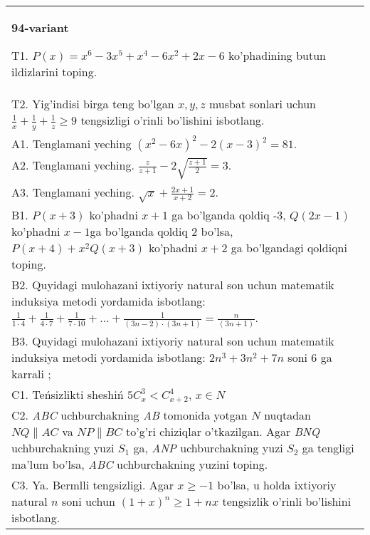 \documentclass{article}
\begin{document}
\begin{tabular}{m{17cm}}
\textbf{94-variant}
\newline

T1. \(P(x) = x^{6} - 3x^{5} + x^{4} - 6x^{2} + 2x - 6\) ko'phadining butun ildizlarini toping. \\
T2. Yig'indisi birga teng bo'lgan \(x,y,z\) musbat sonlari uchun \(\frac{1}{x} + \frac{1}{y} + \frac{1}{z} \geq 9\) tengsizligi o'rinli bo'lishini isbotlang. \\
A1. Tenglamani yeching \(\left( x^{2} - 6x \right)^{2} - 2(x - 3)^{2} = 81\). \\
A2. Tenglamani yeching. \(\frac{z}{z + 1} - 2\sqrt{\frac{z + 1}{2}} = 3\). \\
A3. Tenglamani yeching. \(\sqrt{x} + \frac{2x + 1}{x + 2} = 2\). \\
B1. \(P(x + 3)\) ko'phadni \(x + 1\) ga bo'lganda qoldiq -3, \(Q(2x - 1)\) ko'phadni \(x - 1\)ga bo'lganda qoldiq 2 bo'lsa, \(P(x + 4) + x^{2}Q(x + 3)\) ko'phadni \(x + 2\) ga bo'lgandagi qoldiqni toping. \\
B2. Quyidagi mulohazani ixtiyoriy natural son uchun matematik induksiya metodi yordamida isbotlang: \(\frac{1}{1 \cdot 4} + \frac{1}{4 \cdot 7} + \frac{1}{7 \cdot 10} + \ldots + \frac{1}{(3n - 2) \cdot (3n + 1)} = \frac{n}{(3n + 1)}\). \\
B3. Quyidagi mulohazani ixtiyoriy natural son uchun matematik induksiya metodi yordamida isbotlang: \(2n^{3} + 3n^{2} + 7n\) soni 6 ga karrali ; \\
C1. Teńsizlikti sheshiń \(5C_{x}^{3} < C_{x + 2}^{4}\), \(x \in N\) \\
C2. \emph{ABC} uchburchakning \emph{AB} tomonida yotgan \(N\) nuqtadan \(NQ\| AC\) va \(NP\| BC\) to'g'ri chiziqlar o'tkazilgan. Agar \emph{BNQ} uchburchakning yuzi \(S_{1}\) ga, \emph{ANP} uchburchakning yuzi \(S_{2}\) ga tengligi ma'lum bo'lsa, \emph{ABC} uchburchakning yuzini toping. \\
C3. Ya. Bermlli tengsizligi. Agar \(x \geq - 1\) bo'lsa, u holda ixtiyoriy natural \(n\) soni uchun \((1 + x)^{n} \geq 1 + nx\) tengsizlik o'rinli bo'lishini isbotlang. \\

\end{tabular}
\vspace{1cm}
\end{document}
